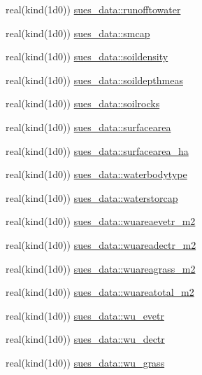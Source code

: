 \begin{DoxyCompactItemize}
\item 
real(kind(1d0)) \hyperlink{namespacesues__data_a92f648948ca3627c9bc8442568c4bba1}{sues\+\_\+data\+::runofftowater}
\item 
real(kind(1d0)) \hyperlink{namespacesues__data_a08339a22d19b4766db4ad302512459ba}{sues\+\_\+data\+::smcap}
\item 
real(kind(1d0)) \hyperlink{namespacesues__data_ac26ae7a72cca3b9be662578e90231c4a}{sues\+\_\+data\+::soildensity}
\item 
real(kind(1d0)) \hyperlink{namespacesues__data_ac09e3f2b843f21d26f4f106cb450df06}{sues\+\_\+data\+::soildepthmeas}
\item 
real(kind(1d0)) \hyperlink{namespacesues__data_a5eb41bdf4cc30812b303de4d2acceb67}{sues\+\_\+data\+::soilrocks}
\item 
real(kind(1d0)) \hyperlink{namespacesues__data_a9d6a1e2ae7fe7c36fb4aaa9e2e3c2137}{sues\+\_\+data\+::surfacearea}
\item 
real(kind(1d0)) \hyperlink{namespacesues__data_a77ef6a343e9a419577fa473535ab3c16}{sues\+\_\+data\+::surfacearea\+\_\+ha}
\item 
real(kind(1d0)) \hyperlink{namespacesues__data_a6433e676b899356c4023713d7a5ab589}{sues\+\_\+data\+::waterbodytype}
\item 
real(kind(1d0)) \hyperlink{namespacesues__data_adf49f9058cfb8894abba11870ace90bf}{sues\+\_\+data\+::waterstorcap}
\item 
real(kind(1d0)) \hyperlink{namespacesues__data_a167fa54ed7df9e23b3dac81232961fa3}{sues\+\_\+data\+::wuareaevetr\+\_\+m2}
\item 
real(kind(1d0)) \hyperlink{namespacesues__data_a3dd16ee1aeeae265f322b0982f33a321}{sues\+\_\+data\+::wuareadectr\+\_\+m2}
\item 
real(kind(1d0)) \hyperlink{namespacesues__data_a9d58cea1a78af7ae81ee097bde9e0ef4}{sues\+\_\+data\+::wuareagrass\+\_\+m2}
\item 
real(kind(1d0)) \hyperlink{namespacesues__data_a4145456981d7aaa8f5b19ab3ea5f1781}{sues\+\_\+data\+::wuareatotal\+\_\+m2}
\item 
real(kind(1d0)) \hyperlink{namespacesues__data_a6aa0ce59c7eee4b94b9ee86ac5b555d0}{sues\+\_\+data\+::wu\+\_\+evetr}
\item 
real(kind(1d0)) \hyperlink{namespacesues__data_a087f298012279c621f24a283b360d592}{sues\+\_\+data\+::wu\+\_\+dectr}
\item 
real(kind(1d0)) \hyperlink{namespacesues__data_a56315a7303bf70155e92ead9b64493c2}{sues\+\_\+data\+::wu\+\_\+grass}

\end{DoxyCompactItemize}

